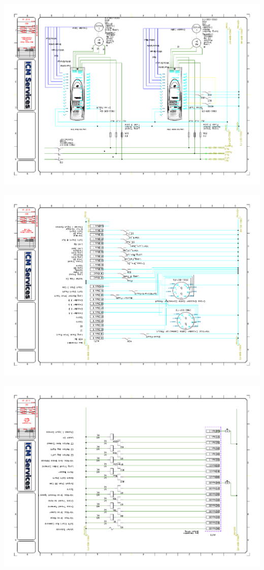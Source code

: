 \begin{center}
	\includegraphics[width=7.5in,angle=90]{../DRAWINGS/19011-008.pdf}
	\label{schem:008} %
\end{center}
\begin{center}
	\includegraphics[width=7.5in,angle=90]{../DRAWINGS/19011-009.pdf}
	\label{schem:009} %
\end{center}
\begin{center}
	\includegraphics[width=7.5in,angle=90]{../DRAWINGS/19011-010.pdf}
	\label{schem:010} %
\end{center}
